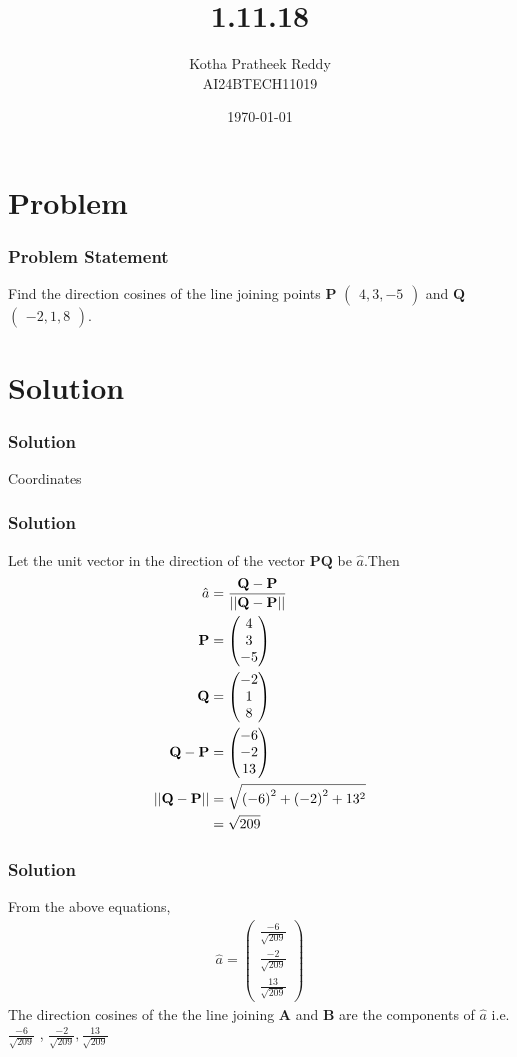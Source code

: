 \documentclass{beamer}
\title{1.11.18}
\author{Kotha Pratheek Reddy\\AI24BTECH11019}
\date{\today}
\providecommand{\brak}[1]{\ensuremath{\left(#1\right)}}
\theoremstyle{remark}
\newcommand{\myvec}[1]{\ensuremath{\begin{pmatrix}#1\end{pmatrix}}}
\let\vec\mathbf
\begin{document}
   \begin{frame}
        \titlepage
    \end{frame}
    \begin{frame}
        \tableofcontents
    \end{frame}
    \section{Problem}
    \begin{frame}
        \frametitle{Problem Statement}
        Find the direction cosines of the line joining points $\vec{P}$  \myvec{4,3,-5} and $\vec{Q}$ \myvec{ -2, 1, 8}.
    \end{frame}
    \section{Solution}
    
        \begin{frame}
		\frametitle{Solution}
		  \begin{table}[H]
      \centering
      

      \caption{Coordinates}
	\label{}
     
  \end{table}

	\end{frame}
    \begin{frame}
	    \frametitle{Solution}
        Let the unit vector in the direction of the vector $\vec{PQ}$ be $\hat{a}$.Then \\
\begin{align}
    \hat{a} &= \frac{\vec{Q}-\vec{P}}{||\vec{Q}-\vec{P}||} \\
    \vec{P} &= \myvec{4 \\ 3 \\ -5} \\
    \vec{Q} &= \myvec{-2 \\ 1 \\8} \\
    \vec{Q}-\vec{P} &= \myvec{-6 \\ -2 \\ 13} \\
	||\vec{Q}-\vec{P}|| &= \sqrt{\brak{-6}^2 + \brak{-2}^2 + 13^2} \notag \\
    &= \sqrt{209} 
\end{align}
    \end{frame}
    \begin{frame}
	    \frametitle{Solution}
        From the above equations, \\
\begin{align}
    \hat{a} = \myvec{ \frac{-6}{\sqrt{209}} \\ \frac{-2}{\sqrt{209}} \\ \frac{13}{\sqrt{209}}}
\end{align}
The direction cosines of the the line joining $\vec{A}$ and $\vec{B}$ are the components of $\hat{a}$ i.e. $\frac{-6}{\sqrt{209}}$ , $\frac{-2}{\sqrt{209}} , \frac{13}{\sqrt{209}}$

    \end{frame}
\end{document}
